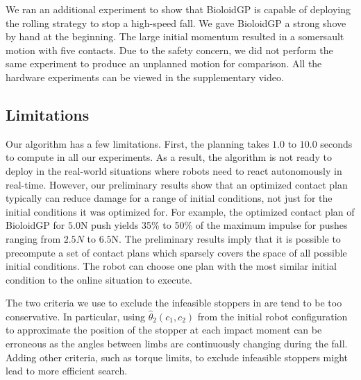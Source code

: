 We ran an additional experiment to show that BioloidGP is capable of
deploying the rolling strategy to stop a high-speed fall. We gave
BioloidGP a strong shove by hand at the beginning. The large initial
momentum resulted in a somersault motion with five contacts. Due to
the safety concern, we did not perform the same experiment to produce
an unplanned motion for comparison. All the hardware experiments can
be viewed in the supplementary video.





\subsection{Limitations}
Our algorithm has a few limitations. First, the planning takes $1.0$
to $10.0$ seconds to compute in all our experiments. As a result, the
algorithm is not ready to deploy in the real-world situations where
robots need to react autonomously in real-time. However, our
preliminary results show that an optimized contact plan typically can
reduce damage for a range of initial conditions, not just for the
initial conditions it was optimized for. For example, the optimized
contact plan of BioloidGP for $5.0$N push yields 35\% to 50\% of the
maximum impulse for pushes ranging from $2.5N$ to $6.5$N.  The
preliminary results imply that it is possible to precompute a set of
contact plans which sparsely covers the space of all possible initial
conditions. The robot can choose one plan with the most similar
initial condition to the online situation to execute.

The two criteria we use to exclude the infeasible stoppers in
 are tend to be too conservative. In particular, using
$\hat{\theta}_2(c_1, c_2)$ from the initial robot configuration to
approximate the position of the stopper at each impact moment can be
erroneous as the angles between limbs are continuously changing during
the fall. Adding other criteria, such as torque limits, to exclude
infeasible stoppers might lead to more efficient search.

